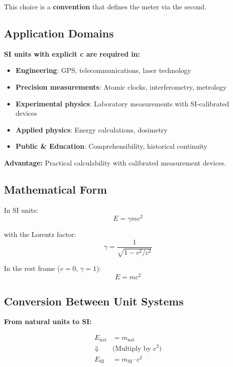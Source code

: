 	This choice is a \textbf{convention} that defines the meter via the second.
	
	\subsection{Application Domains}
	
	\textbf{SI units with explicit c are required in:}
	
	\begin{itemize}
		\item \textbf{Engineering}: GPS, telecommunications, laser technology
		\item \textbf{Precision measurements}: Atomic clocks, interferometry, metrology
		\item \textbf{Experimental physics}: Laboratory measurements with SI-calibrated devices
		\item \textbf{Applied physics}: Energy calculations, dosimetry
		\item \textbf{Public \& Education}: Comprehensibility, historical continuity
	\end{itemize}
	
	\textbf{Advantage:} Practical calculability with calibrated measurement devices.
	
	\subsection{Mathematical Form}
	
	In SI units:
	\begin{equation}
		E = \gamma m c^2
	\end{equation}
	
	with the Lorentz factor:
	\begin{equation}
		\gamma = \frac{1}{\sqrt{1 - v^2/c^2}}
	\end{equation}
	
	In the rest frame ($v=0$, $\gamma=1$):
	\begin{equation}
		E = mc^2
	\end{equation}
	
	\subsection{Conversion Between Unit Systems}
	
	\textbf{From natural units to SI:}
	
	\begin{align}
		E_{\text{nat}} &= m_{\text{nat}} \\
		\Downarrow \quad &\text{(Multiply by } c^2\text{)} \\
		E_{\text{SI}} &= m_{\text{SI}} \cdot c^2
	\end{align}
	
